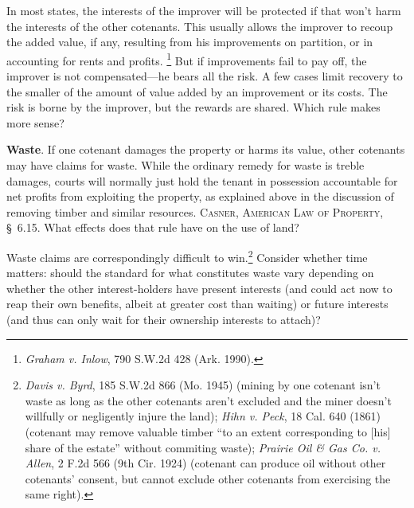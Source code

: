 In most states, the interests of the improver will be protected if that won't
harm the interests of the other cotenants. This usually allows the improver to
recoup the added value, if any, resulting from his improvements on partition, or
in accounting for rents and profits. \footnote{\emph{Graham v. Inlow}, 790
S.W.2d 428 (Ark. 1990).} But if improvements fail to pay off, the improver is
not compensated---he bears all the risk. A few cases limit recovery to the
smaller of the amount of value added by an improvement or its costs. The risk is
borne by the improver, but the rewards are shared. Which rule makes more sense?

\item \textbf{Waste}. If one cotenant damages the property or harms
its value, other cotenants may have claims for waste. While the ordinary
remedy for waste is treble damages, courts will normally just hold the tenant
in possession accountable for net profits from exploiting the property, as
explained above in the discussion of removing timber and similar resources.
\textsc{Casner, American Law of Property}, \S~6.15. What effects does that
rule have on the use of land?


Waste claims are correspondingly difficult to win.\footnote{\emph{Davis v.
Byrd}, 185 S.W.2d 866 (Mo. 1945) (mining by one cotenant isn't waste as long as
the other cotenants aren't excluded and the miner doesn't willfully or
negligently injure the land); \emph{Hihn v. Peck}, 18 Cal. 640 (1861) (cotenant
may remove valuable timber ``to an extent corresponding to [his] share of the
estate'' without commiting waste); \emph{Prairie Oil \& Gas Co. v. Allen}, 2
F.2d 566 (9th Cir. 1924) (cotenant can produce oil without other cotenants'
consent, but cannot exclude other cotenants from exercising the same right).}
Consider whether time matters: should the standard for what constitutes waste
vary depending on whether the other interest-holders have present interests (and
could act now to reap their own benefits, albeit at greater cost than waiting)
or future interests (and thus can only wait for their ownership interests to
attach)?

